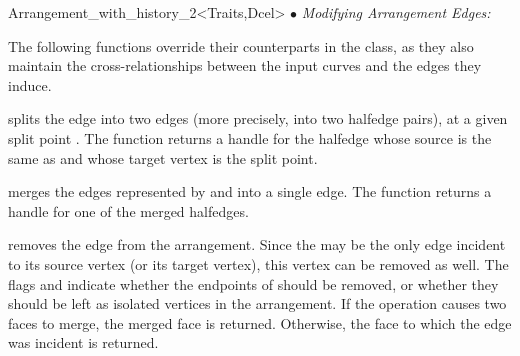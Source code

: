\begin{ccRefClass}{Arrangement_with_history_2<Traits,Dcel>}
$\bullet$ {\sl Modifying Arrangement Edges:}

The following functions override their counterparts in the 
class, as they also maintain the cross-relationships between the input
curves and the edges they induce.

  {splits the edge  into two edges (more precisely, into two halfedge
   pairs), at a given split point .
   The function returns a handle for the halfedge whose source is the same
   as  and whose target vertex is the split point.
   }

  {merges the edges represented by  and  into
   a single edge. 
   The function returns a handle for one of the merged halfedges.
   }

  {removes the edge  from the arrangement. Since the  may
   be the only edge incident to its source vertex (or its target vertex),
   this vertex can be removed as well. The flags  and
    indicate whether the endpoints of  should be
   removed, or whether they should be left as isolated vertices in the
   arrangement.
   If the operation causes two faces to merge, the merged face is returned.
   Otherwise, the face to which the edge was incident is returned.}

\ccSeeAlso
    \\
    \\
    \\
     \\
     \\
     \\

\end{ccRefClass}

\ccRefPageEnd
